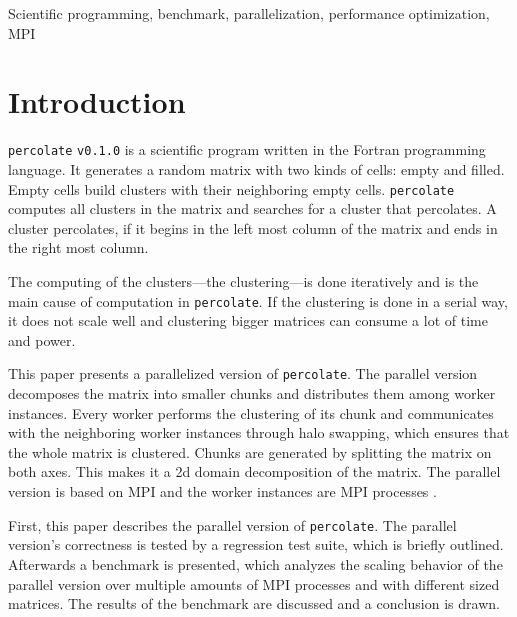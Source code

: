\documentclass[twoside,11pt]{article}
\title{\titl}
\author{}
\def\perc{\texttt{perco\-late}}
\def\v{\texttt{v0.1.0}}
\begin{document}
\maketitle

\begin{abstract}
\end{abstract}

\begin{keywords}
Scientific programming, benchmark, parallelization,
performance optimization, MPI
\end{keywords}

\section{Introduction} %

\perc{} \v{} is a scientific program written in the Fortran
programming language. It generates a random matrix with two
kinds of cells: empty and filled. Empty cells build
clusters with their neighboring empty cells.
\perc{} computes all clusters in the matrix and searches
for a cluster that percolates.
A cluster percolates, if it begins in the left most column
of the matrix and ends in the right most column.

The computing of the clusters---the clustering---is done
iteratively and is the main cause of computation in
\perc{}.
If the clustering is done in a serial way, it does not
scale well and clustering bigger matrices can consume a
lot of time and power.

This paper presents a parallelized version of \perc{}.
The parallel version decomposes the matrix into smaller
chunks and distributes them among worker instances.
Every worker performs the clustering of its chunk and
communicates with the neighboring worker
instances through halo swapping, which ensures that the
whole matrix is clustered.
Chunks are generated by splitting the matrix on both axes.
This makes it a 2d domain decomposition of the matrix.
The parallel version is based on MPI and the worker
instances are MPI processes \citep[see][]{mpi}.

First, this paper describes the parallel version of
\perc{}.
The parallel version's correctness is tested by a
regression test suite, which is briefly outlined.
Afterwards a benchmark is presented, which analyzes the
scaling behavior of the parallel version over multiple
amounts of MPI processes and with different sized matrices.
The results of the benchmark are discussed and a conclusion
is drawn.
\end{document}
